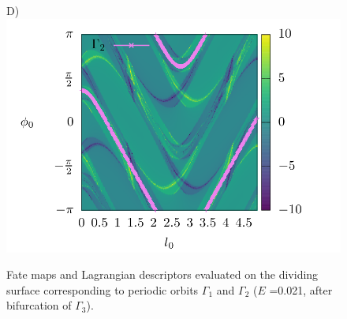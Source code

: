 \documentclass[10pt,aps,onecolumn,superscriptaddress]{revtex4-2}
\begin{document}
\begin{figure}[htbp]
	D)\includegraphics[scale=0.35]{ld_action_ds_gamma2_E_0021.png}
	\caption{ Fate maps and Lagrangian descriptors evaluated on the dividing surface corresponding to periodic orbits $\Gamma_1$ and $\Gamma_2$ ($E$ =0.021, after bifurcation of $\Gamma_3$). }
	\label{fig:ld_fm_ds}
\end{figure}
\end{document}
